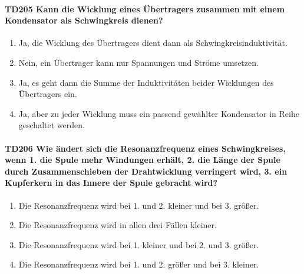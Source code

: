 \documentclass[8pt]{article}
\begin{document}
\begin{enumerate}
\begin{enumerate}[nolistsep,label=\Alph*]
{\paragraph*{TD205 Kann die Wicklung eines Übertragers zusammen mit einem Kondensator als Schwingkreis dienen?}
\begin{enumerate}[nolistsep,label=\Alph*]
\item Ja, die Wicklung des Übertragers dient dann als Schwingkreisinduktivität.
\item Nein, ein Übertrager kann nur Spannungen und Ströme umsetzen.
\item Ja, es geht dann die Summe der Induktivitäten beider Wicklungen des Übertragers ein.
\item Ja, aber zu jeder Wicklung muss ein passend gewählter Kondensator in Reihe geschaltet werden.
\end{enumerate}

\paragraph*{TD206 Wie ändert sich die Resonanzfrequenz eines Schwingkreises, wenn 1. die Spule mehr Windungen erhält, 2. die Länge der Spule durch Zusammenschieben der Drahtwicklung verringert wird, 3. ein Kupferkern in das Innere der Spule gebracht wird?}
\begin{enumerate}[nolistsep,label=\Alph*]
\item Die Resonanzfrequenz wird bei 1. und 2. kleiner und bei 3. größer. 
\item Die Resonanzfrequenz wird in allen drei Fällen kleiner.
\item Die Resonanzfrequenz wird bei 1. kleiner und bei 2. und 3. größer. 
\item Die Resonanzfrequenz wird bei 1. und 2. größer und bei 3. kleiner.
\end{enumerate}

}
\end{enumerate}
\end{enumerate}
\end{document}
